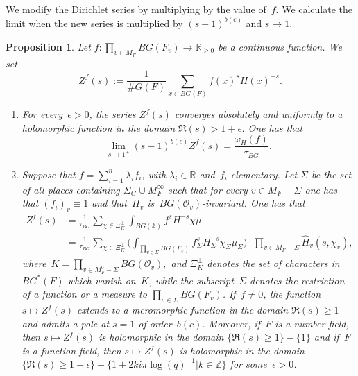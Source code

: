 \documentclass[a4paper,english,12pt]{amsart}
\newcommand{\RR}{\mathbb{R}}
\newcommand{\ZZ}{\mathbb{Z}}
\newcommand{\Ov}{\mathcal O _v}
\newcommand{\vMF}{v\in M_F}
\newcommand{\vMFz}{v\in M_F ^0}
\newcommand{\AAA}{\mathbb A}
\newcommand{\wH}{\widehat H}
\newtheorem{prop}[equation]{Proposition}
\numberwithin{equation}{subsection}
\begin{document}
\subsubsection{}We modify the Dirichlet series by multiplying by the value of~$f$. We calculate the limit when the new series is multiplied by $(s-1)^{b(c)}$ and $s\to 1$.
\begin{prop}\label{genfz}
Let $f:\prod_{\vMF}BG(F_v)\to \RR_{\geq 0}$ be a continuous function. We set $$Z^f(s):=\frac{1}{\# G(F)}\sum_{x\in BG(F)}f(x)^sH(x)^{-s}.$$ 
\begin{enumerate}
\item For every~$\epsilon>0$, the series $Z^f(s)$ converges absolutely and uniformly to a holomorphic function in the domain $\Re(s)>1+\epsilon$. One has that $$\lim_{s\to 1^+}(s-1)^{b(c)}Z^f(s)=\frac{\omega_H(f)}{\tau_{BG}}.$$
\item Suppose that $f=\sum_{i=1}^n\lambda_if_i$, with $\lambda_i\in\RR$ and~$f_i$ elementary. Let $\Sigma$ be the set of all places containing $\Sigma_G\cup M_F^\infty$ such that for every $v\in M_F-\Sigma$ one has that $(f_i)_v\equiv 1$ and that~$H_v$ is~$BG(\Ov)$-invariant. One has that \begin{align*}
Z^f(s)&=\frac{1}{\tau_{BG}}\sum_{\chi\in \Xi^{\perp}_K}\int_{BG(\AAA)}f^sH^{-s}\chi\mu\\&=\frac{1}{\tau_{BG}}\sum_{\chi\in \Xi_K^{\perp}}\bigg(\int_{\prod_{v\in \Sigma}BG(F_v)}f_{\Sigma}^sH_{\Sigma}^{-s}\chi_{\Sigma}\mu_{\Sigma}\bigg) \cdot \prod_{v\in M_F-\Sigma}\wH_v(s,\chi_v),\end{align*}
where~$K=\prod_{\vMFz-\Sigma}BG(\Ov),$ and $\Xi_K^{\perp}$ denotes the set of characters in $BG^*(F)$ which vanish on~$K$, while the subscript~$\Sigma$ denotes the restriction of a function or a measure to $\prod_{v\in\Sigma}BG(F_v)$. If~$f\neq 0$, the function $s\mapsto Z^f(s)$ extends to a meromorphic function in the domain $\Re(s)\geq 1$ and admits a pole at $s=1$ of order~$b(c)$. Moreover, if~$F$ is a number field, then $s\mapsto Z^f(s)$ is holomorphic in the domain $\{\Re(s)\geq 1\}-\{1\}$ and if~$F$ is a function field, then $s\mapsto Z^f(s)$ is holomorphic in the domain $\{\Re(s)\geq 1-\epsilon\}-\{1+2ki\pi\log(q)^{-1}|k\in\ZZ\}$ for some~$\epsilon>0$.
\end{enumerate}
\end{prop}
\end{document}

